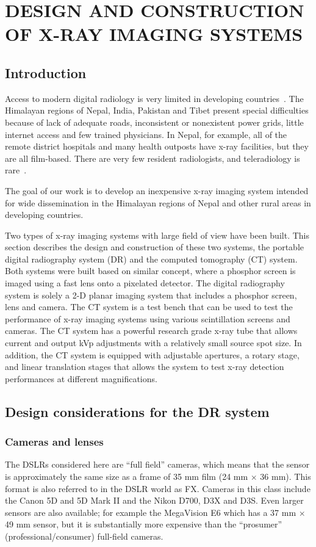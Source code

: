 \chapter{DESIGN AND CONSTRUCTION OF X-RAY IMAGING SYSTEMS}
\label{chap:design_construction}

\section{Introduction}
Access to modern digital radiology is very limited in developing countries~\citep{telehealth2009}. The Himalayan regions of Nepal, India, Pakistan and Tibet present special difficulties because of lack of adequate roads, inconsistent or nonexistent power grids, little internet access and few trained physicians. In Nepal, for example, all of the remote district hospitals and many health outposts have x-ray facilities, but they are all film-based. There are very few resident radiologists, and teleradiology is rare~\citep{telehealth2009, Graham2003}.

The goal of our work is to develop an inexpensive x-ray imaging system intended for wide dissemination in the Himalayan regions of Nepal and other rural areas in developing countries.

Two types of x-ray imaging systems with large field of view have been built.  This section describes the design and construction of these two systems, the portable digital radiography system (DR) and the computed tomography (CT) system.  Both systems were built based on similar concept, where a phosphor screen is imaged using a fast lens onto a pixelated detector.  The digital radiography system is solely a 2-D planar imaging system that includes a phosphor screen, lens and camera.  The CT system is a test bench that can be used to test the performance of x-ray imaging systems using various scintillation screens and cameras.  The CT system has a powerful research grade x-ray tube that allows current and output kVp adjustments with a relatively small source spot size.  In addition, the CT system is equipped with adjustable apertures, a rotary stage, and linear translation stages that allows the system to test x-ray detection performances at different magnifications.

\section{Design considerations for the DR system}
\label{sect:design_considerations_for_DR}
\subsection{Cameras and lenses}
\label{subsect:camera_lenses}
The DSLRs considered here are ``full field'' cameras, which means that the sensor is approximately the same size as a frame of 35 mm film (24 mm $\times$ 36 mm).  This format is also referred to in the DSLR world as FX. Cameras in this class include the Canon 5D and 5D Mark II and the Nikon D700, D3X and D3S. Even larger sensors are also available; for example the MegaVision E6 which has a 37 mm $\times$ 49 mm sensor, but it is substantially more expensive than the ``prosumer'' (professional/consumer) full-field cameras.

